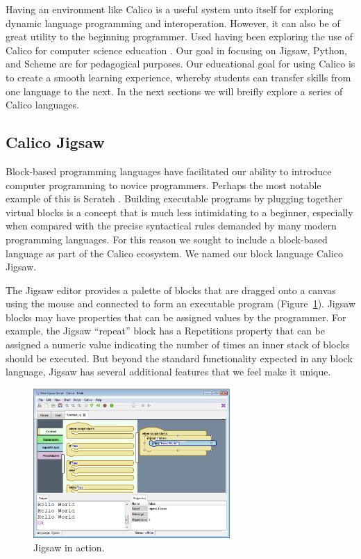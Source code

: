 \documentclass[preprint]{sigplanconf}
\begin{document}
Having an environment like Calico is a useful system unto itself for
exploring dynamic language programming and interoperation. However, it
can also be of great utility to the beginning programmer. Used having
been exploring the use of Calico for computer science education
\cite{blank-etal-2012, blank-ohara-2013}. Our goal in focusing on
Jigsaw, Python, and Scheme are for pedagogical purposes. Our
educational goal for using Calico is to create a smooth learning
experience, whereby students can transfer skills from one language to
the next. In the next sections we will breifly explore a series of
Calico languages.

\subsection{Calico Jigsaw}

Block-based programming languages have facilitated our ability to
introduce computer programming to novice programmers. Perhaps the most
notable example of this is Scratch \cite{scratch}. Building
executable programs by plugging together virtual blocks is a concept
that is much less intimidating to a beginner, especially when
compared with the precise syntactical rules demanded by many modern
programming languages. For this reason we sought to include a
block-based language as part of the Calico ecosystem. We named our
block language Calico Jigsaw.

The Jigsaw editor provides a palette of blocks that are dragged onto a
canvas using the mouse and connected to form an executable program
(Figure~\ref{jigsaw1}). Jigsaw blocks may have properties that can be assigned
values by the programmer. For example, the Jigsaw ``repeat'' block has
a Repetitions property that can be assigned a numeric value indicating
the number of times an inner stack of blocks should be executed. But
beyond the standard functionality expected in any block language,
Jigsaw has several additional features that we feel make it unique.

\begin{figure}[h!]
  \centering
     \includegraphics[width=75mm]{jigsaw1.eps}
  \caption{Jigsaw in action.}
  \label{jigsaw1}
\end{figure}
\end{document}
